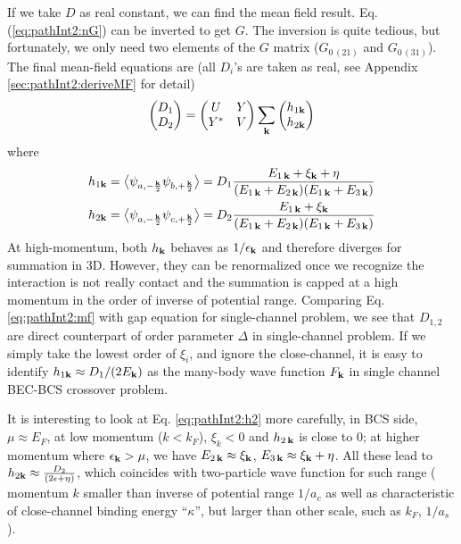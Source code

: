  
  If we take $D$ as real constant,
  we can find the mean field result. Eq. (\ref{eq:pathInt2:nG}) can be inverted to get $G$.  The inversion is quite tedious, but fortunately, we only need two elements of the $G$ matrix ($G_{0\, (21)}$ and $G_{0 \,(31)}$).  The final mean-field equations are (all $D_{i}$'s are taken as real, see Appendix \ref{sec:pathInt2:deriveMF} for detail) 
  \begin{equation}\label{eq:pathInt2:mf}
\begin{pmatrix}D_1\\D_2\end{pmatrix}=\begin{pmatrix}U&Y\\Y^{*}&V\end{pmatrix}\sum_{\mathbf{k}}\begin{pmatrix}h_{1\mathbf{k}}\\h_{2\mathbf{k}}\end{pmatrix}
\end{equation}
  where 
  \begin{gather}
  h_{1\mathbf{k}}=\bigl<{\psi_{a,-\frac{\mathbf{k}}{2}}\psi_{b,+\frac{\mathbf{k}}{2}}}\bigr>
  =D_{1}\frac{E_{1\,\mathbf{k}}+\xi_{\mathbf{k}}+\eta}{(E_{1\,\mathbf{k}}+E_{2\,\mathbf{k}})(E_{1\,\mathbf{k}}+E_{3\,\mathbf{k}})}\label{eq:pathInt2:h1}\\
  h_{2\mathbf{k}}=\bigl<{\psi_{a,-\frac{\mathbf{k}}{2}}\psi_{c,+\frac{\mathbf{k}}{2}}}\bigr>
  =D_{2}\frac{E_{1\,\mathbf{k}}+\xi_{\mathbf{k}}}{(E_{1\,\mathbf{k}}+E_{2\,\mathbf{k}})(E_{1\,\mathbf{k}}+E_{3\,\mathbf{k}})}\label{eq:pathInt2:h2}
  \end{gather}
At high-momentum, both $h_{\mathbf{k}}$ behaves as $1/\epsilon_{\mathbf{k}}$ and therefore diverges for summation in 3D.  However, they can be  renormalized once we recognize the interaction is not really contact and the summation is capped at a high momentum in the order of inverse of potential range.  
Comparing Eq. \ref{eq:pathInt2:mf} with gap equation for single-channel problem, we  see that $D_{1,2}$ are  direct counterpart of order parameter $\Delta$ in single-channel problem. 
If we simply take the lowest order of $\xi_{i}$, and ignore the close-channel, it is easy to identify $h_{1\mathbf{k}}\approx{D_{1}}/(2E_{\mathbf{k}})$ as the many-body wave function $F_{\mathbf{k}}$ in single channel BEC-BCS crossover problem.  


It is interesting to look at Eq. \ref{eq:pathInt2:h2} more carefully, in BCS side, $\mu\approx{}E_{F}$, at low momentum ($k<k_{F}$), $\xi_k<0$ and $h_{2\,\mathbf{k}}$ is close to 0; at higher momentum where $\epsilon_{\mathbf{k}}>\mu$, we have $E_{2\,\mathbf{k}}\approx\xi_{\mathbf{k}}$, $E_{3\,\mathbf{k}}\approx\xi_{\mathbf{k}}+\eta$.  All these lead to $  h_{2\mathbf{k}}\approx\frac{D_2}{(2\epsilon+\eta)}$, which coincides with two-particle wave function for such range ( momentum $k$ smaller than inverse of potential range $1/a_{c}$ as well as  characteristic of close-channel binding energy ``$\kappa$'', but larger than other scale, such as $k_{F}$, $1/a_{s}$).
 
